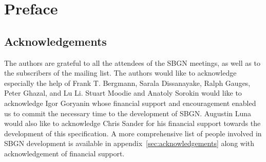
\chapter{Preface}

\section*{Acknowledgements}

The authors are grateful to all the attendees of the SBGN meetings, as well as to the subscribers of the  mailing list.
The authors would like to acknowledge especially the help of Frank T. Bergmann, Sarala Dissanayake, Ralph Gauges, Peter Ghazal, and Lu Li.
Stuart Moodie and Anatoly Sorokin would like to acknowledge Igor Goryanin whose financial support and encouragement enabled us to commit the necessary time to the development of SBGN.
Augustin Luna would also like to acknowledge Chris Sander for his financial support towards the development of this specification.
A more comprehensive list of people involved in SBGN development is available in appendix~\ref{sec:acknowledgements} along with acknowledgement of financial support.



